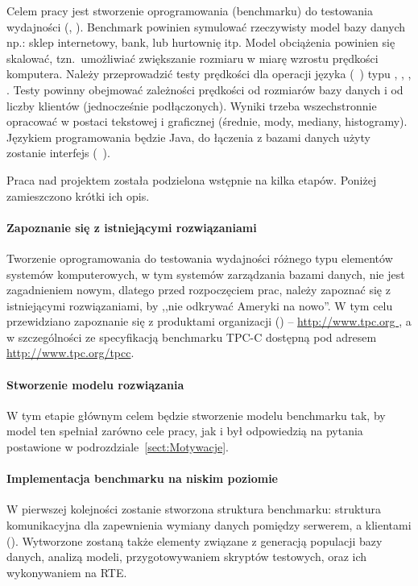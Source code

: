Celem pracy jest stworzenie oprogramowania (benchmarku) do testowania wydajności
 (, ). 
Benchmark powinien symulować rzeczywisty model bazy danych np.: sklep internetowy, bank, lub hurtownię itp.
Model obciążenia powinien się skalować, tzn.~umożliwiać zwiększanie rozmiaru w miarę wzrostu prędkości komputera.
Należy przeprowadzić testy prędkości dla operacji języka  (~\cite{SQL}) typu 
, , , .
Testy powinny obejmować zależności prędkości od rozmiarów bazy danych i od liczby klientów (jednocześnie podłączonych). 
Wyniki trzeba wszechstronnie opracować w postaci tekstowej i graficznej (średnie, mody, mediany, histogramy).
Językiem programowania będzie Java, do łączenia z bazami danych użyty zostanie interfejs  
(~\cite{JDBC1}).

Praca nad projektem została podzielona wstępnie na kilka etapów. Poniżej zamieszczono krótki ich opis.

\paragraph{Zapoznanie się z istniejącymi rozwiązaniami}
Tworzenie oprogramowania do testowania wydajności różnego typu elementów systemów komputerowych,
w tym systemów zarządzania bazami danych, nie jest zagadnieniem nowym, dlatego przed rozpoczęciem prac, 
należy zapoznać się z istniejącymi rozwiązaniami, by ,,nie odkrywać Ameryki na nowo''.
W tym celu przewidziano zapoznanie się z produktami organizacji  () 
-- \url{http://www.tpc.org }, a w szczególności ze specyfikacją benchmarku 
TPC-C dostępną pod adresem \url{http://www.tpc.org/tpcc}.

\paragraph{Stworzenie modelu rozwiązania}
W tym etapie głównym celem będzie stworzenie modelu benchmarku tak, by model ten
spełniał zarówno cele pracy, jak i był odpowiedzią na pytania postawione w 
podrozdziale~\ref{sect:Motywacje}.

\paragraph{Implementacja benchmarku na niskim poziomie}
W pierwszej kolejności zostanie stworzona struktura benchmarku: struktura komunikacyjna
dla zapewnienia wymiany danych pomiędzy serwerem, a klientami  ().
Wytworzone zostaną także elementy związane z generacją populacji bazy danych, 
analizą modeli, przygotowywaniem skryptów testowych, oraz ich wykonywaniem na RTE.

